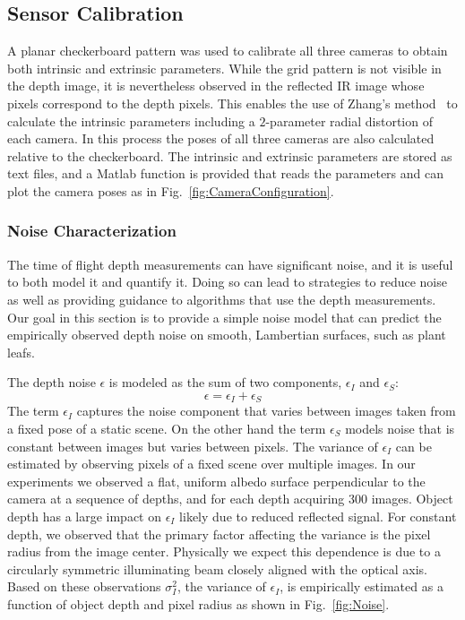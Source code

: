 

\subsection{Sensor Calibration}

A planar checkerboard pattern was used to calibrate all three cameras to obtain both intrinsic and extrinsic parameters.  While the grid pattern is not visible in the depth image, it is nevertheless observed in the reflected IR image whose pixels correspond to the depth pixels.  This enables the use of Zhang's method~\cite{Zhang2000} to calculate the intrinsic parameters including a $2$-parameter radial distortion of each camera.  In this process the poses of all three cameras are also calculated relative to the checkerboard.  The intrinsic and extrinsic parameters are stored as text files, and a Matlab function is provided that reads the parameters and can plot the camera poses as in Fig.~\ref{fig:CameraConfiguration}.


\subsubsection{Noise Characterization}
\label{sec:bias}

The time of flight depth measurements can have significant noise, and it is useful to both model it and quantify it.  Doing so can lead to strategies to reduce noise as well as providing guidance to algorithms that use the depth measurements.  Our goal in this section is to provide a simple noise model that can predict the empirically observed depth noise on smooth, Lambertian surfaces, such as plant leafs.  

The depth noise $\epsilon$ is modeled as the sum of two components, $\epsilon_I$ and $\epsilon_S$: 
\begin{equation}
	\epsilon = \epsilon_I + \epsilon_S\label{eq:epsilon}
\end{equation}
The term $\epsilon_I$ captures the noise component that varies between images taken from a fixed pose of a static scene. On the other hand the term $\epsilon_S$ models noise that is constant between images but varies between pixels. The variance of $\epsilon_I$ can be estimated by observing pixels of a fixed scene over multiple images.  In our experiments we observed a flat, uniform albedo surface perpendicular to the camera at a sequence of depths, and for each depth acquiring 300 images.  Object depth has a large impact on $\epsilon_I$ likely due to reduced reflected signal.  For constant depth, we observed that the primary factor affecting the variance is the pixel radius from the image center.  Physically we expect this dependence is due to a circularly symmetric illuminating beam closely aligned with the optical axis.  Based on these observations $\sigma_I^2$, the variance of $\epsilon_I$, is empirically estimated as a function of object depth and pixel radius as shown in Fig.~\ref{fig:Noise}.  

